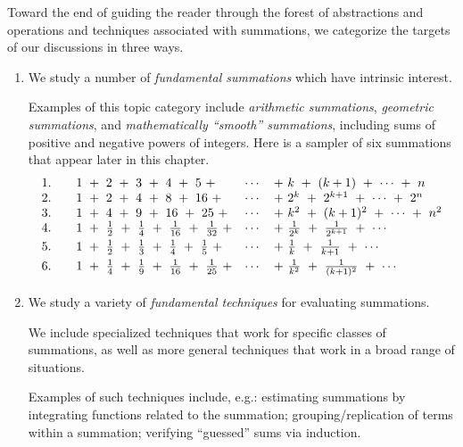 \bigskip

Toward the end of guiding the reader through the forest of abstractions and operations and techniques associated with summations, we categorize the targets of our discussions in three ways.
\begin{enumerate}
\item
We study a number of {\it fundamental summations} which have intrinsic interest.

\smallskip

Examples of this topic category include {\it arithmetic summations}, {\it geometric summations}, and {\it mathematically ``smooth'' summations}, including sums of positive and negative powers of integers.  Here is a sampler of six summations that appear later in this chapter.
\[
\begin{array}{lclcl}
1.  & &
1 \ + \ 2 \ + \ 3 \ + \ 4 \ + \ 5 \ + & \cdots & + \ k  \ + \ (k+1) \ + \ \cdots \ + \ n \\
2. & &
1 \ + \ 2 \ + \ 4 \ + \ 8 \ + \ 16 \ + & \cdots & + \ 2^k  \ + \ 2^{k+1} \ + \ \cdots \ + \ 2^n \\
3. & &
1 \ + \ 4 \ + \ 9 \ + \ 16 \ + \ 25 \ + & \cdots & + \ k^2  \ + \ (k+1)^2 \ + \ \cdots \ + \ n^2 \\
\smallskip
4. & &
1 \ + \ \frac{1}{2} \ + \ \frac{1}{4} \ + \ \frac{1}{16} \ + \ \frac{1}{32} \ + & \cdots & + \ \frac{1}{2^k}  \ + \ \frac{1}{2^{k+1}} \ + \ \cdots \\
\smallskip
5. & &
1 \ + \ \frac{1}{2} \ + \ \frac{1}{3} \ + \ \frac{1}{4} \ + \ \frac{1}{5} \ + & \cdots & + \ \frac{1}{k}  \ + \ \frac{1}{k+1} \ + \ \cdots \\
\smallskip
6. & &
1 \ + \ \frac{1}{4} \ + \ \frac{1}{9} \ + \ \frac{1}{16} \ + \ \frac{1}{25} \ + & \cdots & + \ \frac{1}{k^2}  \ + \ \frac{1}{(k+1)^2} \ + \ \cdots
\end{array}
\]

\item
We study a variety of {\it fundamental techniques} for evaluating summations.

\smallskip

We include specialized techniques that work for specific classes of summations, as well as more general techniques that work in a broad range of situations.

\smallskip

Examples of such techniques include, e.g.: estimating summations by integrating functions related to the summation; grouping/replication of terms within a summation; verifying ``guessed'' sums via induction.


\end{enumerate}
